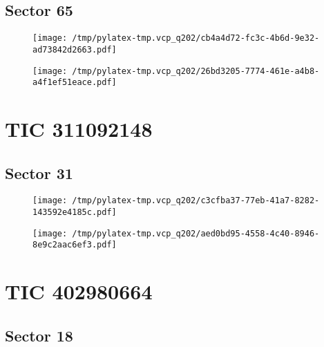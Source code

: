 \documentclass{report}%
\begin{document}
%
\subsection{Sector 65}%
\label{subsec:16766493565}%


\begin{figure}[H]%
\begin{center}%
\centering%
\texttt{[image: /tmp/pylatex-tmp.vcp\_q202/cb4a4d72-fc3c-4b6d-9e32-ad73842d2663.pdf]}%
\end{center}%
\end{figure}

%


\begin{figure}[H]%
\begin{center}%
\centering%
\texttt{[image: /tmp/pylatex-tmp.vcp\_q202/26bd3205-7774-461e-a4b8-a4f1ef51eace.pdf]}%
\end{center}%
\end{figure}

%
\section{TIC 311092148}%
\label{sec:TIC311092148}%
\subsection{Sector 31}%
\label{subsec:31109214831}%


\begin{figure}[H]%
\begin{center}%
\centering%
\texttt{[image: /tmp/pylatex-tmp.vcp\_q202/c3cfba37-77eb-41a7-8282-143592e4185c.pdf]}%
\end{center}%
\end{figure}

%


\begin{figure}[H]%
\begin{center}%
\centering%
\texttt{[image: /tmp/pylatex-tmp.vcp\_q202/aed0bd95-4558-4c40-8946-8e9c2aac6ef3.pdf]}%
\end{center}%
\end{figure}

%
\section{TIC 402980664}%
\label{sec:TIC402980664}%
\subsection{Sector 18}%
\label{subsec:40298066418}%
\end{document}
